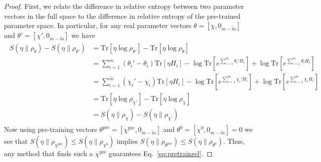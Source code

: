 \documentclass[
    aps,
    prx,
    floatfix,
    nofootinbib,
    onecolumn
]{revtex4-2}
\newcommand{\Tr}{\mathrm{Tr}}
\begin{document}
\begin{proof}
First, we relate the difference in relative entropy between two parameter vectors in the full space to the difference in relative entropy of the pre-trained parameter space. In particular, for any real parameter vectors $\theta = [\chi, 0_{m-\tilde{m}}]$ and $\theta' = [\chi', 0_{m-\tilde{m}}]$ we have
\begin{align}
\begin{split}
    S(\eta \|\rho_{\theta}) - S(\eta \|\rho_{\theta'}) &= \Tr\left[\eta \log \rho_{\theta'}\right] - \Tr\left[\eta \log \rho_\theta\right]\\
    &=\sum_{i=1}^m(\theta_i'-\theta_i)\Tr[\eta H_i] - \log\Tr[e^{\sum_{i=1}^m\theta_i'H_i}] + \log\Tr[e^{\sum_{i=1}^m\theta_iH_i}] \\
    &= \sum_{i=1}^{\tilde{m}}(\chi_i'-\chi_i)\Tr[\eta H_i] - \log\Tr[e^{\sum_{i=1}^{\tilde{m}}\chi_i'H_i}] + \log\Tr[e^{\sum_{i=1}^{\tilde{m}}\chi_iH_i}] \\
    &= \Tr[\eta \log \rho_{\chi'}] - \Tr[\eta \log \rho_\chi] \\
    &= S(\eta \|\rho_{\chi}) - S(\eta \|\rho_{\chi'})
\end{split}
\end{align}
Now using pre-training vectors $\theta^\mathrm{pre} = [\chi^{\mathrm{pre}}, 0_{m-\tilde{m}}]$ and $\theta^0 = [\chi^0, 0_{m-\tilde{m}}]=0$ we see that $S(\eta \|\rho_{\chi^{\mathrm{pre}}})\leq S(\eta \|\rho_{\chi^0})$ implies  $S(\eta \|\rho_{\theta^\mathrm{pre}}) \leq S(\eta \|\rho_{\theta^0})$. Thus, any method that finds such a $\chi^{\mathrm{pre}}$ guarantees Eq.~\eqref{eq:pretrainrel}.
\end{proof}
\end{document}
